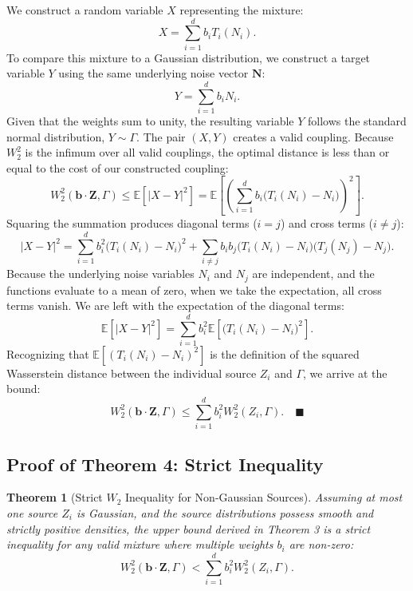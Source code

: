 \documentclass{tpm2026} %
\newtheorem{theorem}{Theorem}
\begin{document}
We construct a random variable $X$ representing the mixture:
\begin{equation}
    X = \sum_{i=1}^d b_i T_i(N_i).
\end{equation}
To compare this mixture to a Gaussian distribution, we construct a target variable $Y$ using the same underlying noise vector $\mathbf{N}$:
\begin{equation}
    Y = \sum_{i=1}^d b_i N_i.
\end{equation}
Given that the weights sum to unity, the resulting variable $Y$ follows the standard normal distribution, $Y \sim \Gamma$. The pair $(X, Y)$ creates a valid coupling. Because $W_2^2$ is the infimum over all valid couplings, the optimal distance is less than or equal to the cost of our constructed coupling:
\begin{equation}
    W_2^2(\mathbf{b} \cdot \mathbf{Z}, \Gamma) \le \mathbb{E}\left[|X - Y|^2\right] = \mathbb{E}\left[ \left( \sum_{i=1}^d b_i \big(T_i(N_i) - N_i\big) \right)^2 \right].
\end{equation}
Squaring the summation produces diagonal terms ($i=j$) and cross terms ($i \neq j$):
\begin{equation}
    |X - Y|^2 = \sum_{i=1}^d b_i^2 \big(T_i(N_i) - N_i\big)^2 + \sum_{i \neq j} b_i b_j \big(T_i(N_i) - N_i\big)\big(T_j(N_j) - N_j\big).
\end{equation}
Because the underlying noise variables $N_i$ and $N_j$ are independent, and the functions evaluate to a mean of zero, when we take the expectation, all cross terms vanish. We are left with the expectation of the diagonal terms:
\begin{equation}
    \mathbb{E}\left[|X - Y|^2\right] = \sum_{i=1}^d b_i^2 \mathbb{E}\left[ \big(T_i(N_i) - N_i\big)^2 \right].
\end{equation}
Recognizing that $\mathbb{E}[ (T_i(N_i) - N_i)^2 ]$ is the definition of the squared Wasserstein distance between the individual source $Z_i$ and $\Gamma$, we arrive at the bound:
\begin{equation}
    W_2^2(\mathbf{b} \cdot \mathbf{Z}, \Gamma) \le \sum_{i=1}^d b_i^2 W_2^2(Z_i, \Gamma). \quad \blacksquare
\end{equation}

\subsection{Proof of Theorem 4: Strict Inequality}
\begin{theorem}[Strict $W_2$ Inequality for Non-Gaussian Sources]
Assuming at most one source $Z_i$ is Gaussian, and the source distributions possess smooth and strictly positive densities, the upper bound derived in Theorem 3 is a strict inequality for any valid mixture where multiple weights $b_i$ are non-zero:
\begin{equation}
    W_2^2(\mathbf{b} \cdot \mathbf{Z}, \Gamma) < \sum_{i=1}^d b_i^2 W_2^2(Z_i, \Gamma).
\end{equation}
\end{theorem}
\end{document}
